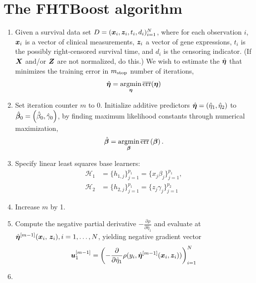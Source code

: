 \section{The FHTBoost algorithm}
\label{algo:fhtboost}
\begin{enumerate}
    \item
        Given a survival data set $D=(\bm{x}_i, \bm{z}_i, t_i,d_i)_{i=1}^N$, where for each observation $i$, $\bm{x}_i$ is a vector of clinical measurements,
        $\bm{z}_i$ a vector of gene expressions, $t_i$ is the possibly right-censored survival time, and $d_i$ is the censoring indicator. 
        (If $\bm{X}$ and/or $\bm{Z}$ are not normalized, do this.)
        We wish to estimate the $\hat{\boldsymbol{\eta}}$ that minimizes the training error in $m_{\text{stop}}$ number of iterations,
        \begin{equation*}
            \hat{\boldsymbol{\eta}}=\operatorname*{argmin}_{\boldsymbol{\eta}}\overline{\text{err}}(\boldsymbol{\eta})
        \end{equation*}
    \item
        Set iteration counter $m$ to $0$.
        Initialize additive predictors $\hat{\boldsymbol{\eta}}=(\hat{\eta}_1, \hat{\eta}_2)$ to $\hat{\boldsymbol{\beta}}_0=\left(\hat{\beta}_{0},\hat{\gamma}_{0}\right)$, by finding maximum likelihood constants through numerical maximization,
        \begin{equation*}
            \hat{\boldsymbol{\beta}}=\operatorname*{argmin}_{\boldsymbol{\beta}}\overline{\text{err}}\left(\boldsymbol{\beta}\right).
        \end{equation*}
    \item
    \label{algostep:FHT-base-learner}
        Specify linear least squares base learners:
        \begin{align*}
            \mathcal{H}_1&=\{h_{1,j}\}_{j=1}^{p_1}=\{x_j\beta_j\}_{j=1}^{p_1}, \\
            \mathcal{H}_2&=\{h_{2,j}\}_{j=1}^{p_1}=\{z_j\gamma_j\}_{j=1}^{p_2}
        \end{align*}
    \item
    \label{algostep:FHT-init}
        Increase $m$ by 1.
    \item
        Compute the negative partial derivative $-\frac{\partial\rho}{\partial \hat{\eta}_1}$
        and evaluate at $\hat{\boldsymbol{\eta}}^{[m-1]}(\bm{x}_i,\,\bm{z}_i),i=1,\ldots,N$, yielding negative gradient vector
        \begin{equation}
            \bm{u}^{[m-1]}_1=\left(-\frac{\partial}{\partial \hat{\eta}_1}\rho(y_i, \hat{\boldsymbol{\eta}}^{[m-1]}(\bm{x}_i,\bm{z}_i))\right)_{i=1}^N
        \end{equation}
    \item

\end{enumerate}

